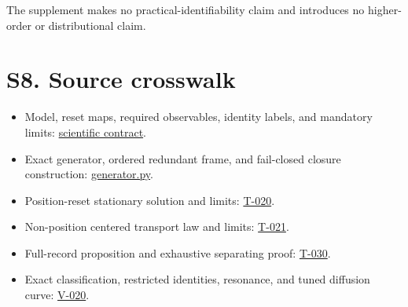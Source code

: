 The supplement makes no practical-identifiability claim and introduces no higher-order or distributional claim.

\section{S8. Source crosswalk}\label{s8.-source-crosswalk}

\begin{itemize}
\tightlist
\item
  Model, reset maps, required observables, identity labels, and mandatory limits: \href{https://github.com/blakepi/phasemap-reproducibility/blob/v3.1.1/docs/scientific-contract/CONTRACT.md}{scientific contract}.
\item
  Exact generator, ordered redundant frame, and fail-closed closure construction: \href{https://github.com/blakepi/phasemap-reproducibility/blob/v3.1.1/src/phasemap/theory/generator.py}{generator.py}.
\item
  Position-reset stationary solution and limits: \href{https://github.com/blakepi/phasemap-reproducibility/blob/v3.1.1/artifacts/derived/T-020-position-protocols.md}{T-020}.
\item
  Non-position centered transport law and limits: \href{https://github.com/blakepi/phasemap-reproducibility/blob/v3.1.1/artifacts/derived/T-021-nonposition-protocols.md}{T-021}.
\item
  Full-record proposition and exhaustive separating proof: \href{https://github.com/blakepi/phasemap-reproducibility/blob/v3.1.1/artifacts/derived/T-030-memory-channel-proposition.md}{T-030}.
\item
  Exact classification, restricted identities, resonance, and tuned diffusion curve: \href{https://github.com/blakepi/phasemap-reproducibility/blob/v3.1.1/artifacts/derived/V-020-equivalence-map.md}{V-020}.
\end{itemize}
